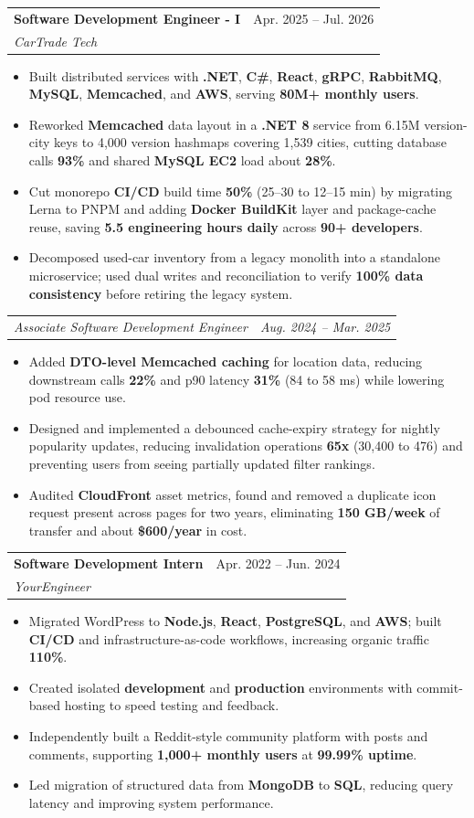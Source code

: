 \documentclass[letterpaper,11pt]{article}
\makeatletter
\newcommand{\resumeItem}[1]{
  \item\small{
    {#1 \vspace{-2pt}}
  }
}
\newcommand{\resumeSubheading}[4]{
  \vspace{-2pt}\item
    \begin{tabular*}{0.97\textwidth}[t]{l@{\extracolsep{\fill}}r}
      \textbf{#1} & #2 \\
      \textit{\small#3} & \textit{\small #4} \\
    \end{tabular*}\vspace{-7pt}
}
\newcommand{\resumeSubSubheading}[2]{
    \item
    \begin{tabular*}{0.97\textwidth}{l@{\extracolsep{\fill}}r}
      \textit{\small#1} & \textit{\small #2} \\
    \end{tabular*}\vspace{-7pt}
}
\newcommand{\resumeItemListStart}{\begin{itemize}}
\newcommand{\resumeItemListEnd}{\end{itemize}\vspace{-5pt}}
\makeatother
\begin{document}
\resumeSubheading
{Software Development Engineer - I}{Apr. 2025 -- Jul. 2026}
{CarTrade Tech}{ }
\resumeItemListStart
\resumeItem{Built distributed services with \textbf{.NET}, \textbf{C\#}, \textbf{React}, \textbf{gRPC}, \textbf{RabbitMQ}, \textbf{MySQL}, \textbf{Memcached}, and \textbf{AWS}, serving \textbf{80M+ monthly users}.}
\resumeItem{Reworked \textbf{Memcached} data layout in a \textbf{.NET 8} service from 6.15M version-city keys to 4,000 version hashmaps covering 1,539 cities, cutting database calls \textbf{93\%} and shared \textbf{MySQL EC2} load about \textbf{28\%}.}
\resumeItem{Cut monorepo \textbf{CI/CD} build time \textbf{50\%} (25--30 to 12--15 min) by migrating Lerna to PNPM and adding \textbf{Docker BuildKit} layer and package-cache reuse, saving \textbf{5.5 engineering hours daily} across \textbf{90+ developers}.}
\resumeItem{Decomposed used-car inventory from a legacy monolith into a standalone microservice; used dual writes and reconciliation to verify \textbf{100\% data consistency} before retiring the legacy system.}
\resumeItemListEnd
\resumeSubSubheading
{Associate Software Development Engineer}{Aug. 2024 -- Mar. 2025}
\resumeItemListStart
\resumeItem{Added \textbf{DTO-level Memcached caching} for location data, reducing downstream calls \textbf{22\%} and p90 latency \textbf{31\%} (84 to 58 ms) while lowering pod resource use.}
\resumeItem{Designed and implemented a debounced cache-expiry strategy for nightly popularity updates, reducing invalidation operations \textbf{65x} (30,400 to 476) and preventing users from seeing partially updated filter rankings.}
\resumeItem{Audited \textbf{CloudFront} asset metrics, found and removed a duplicate icon request present across pages for two years, eliminating \textbf{150 GB/week} of transfer and about \textbf{\$600/year} in cost.}
\resumeItemListEnd

\resumeSubheading
{Software Development Intern}{Apr. 2022 -- Jun. 2024}
{YourEngineer}{ }
\resumeItemListStart
\resumeItem{Migrated WordPress to \textbf{Node.js}, \textbf{React}, \textbf{PostgreSQL}, and \textbf{AWS}; built \textbf{CI/CD} and infrastructure-as-code workflows, increasing organic traffic \textbf{110\%}.}
\resumeItem{Created isolated \textbf{development} and \textbf{production} environments with commit-based hosting to speed testing and feedback.}
\resumeItem{Independently built a Reddit-style community platform with posts and comments, supporting \textbf{1,000+ monthly users} at \textbf{99.99\% uptime}.}
\resumeItem{Led migration of structured data from \textbf{MongoDB} to \textbf{SQL}, reducing query latency and improving system performance.}
\resumeItemListEnd
\end{document}
